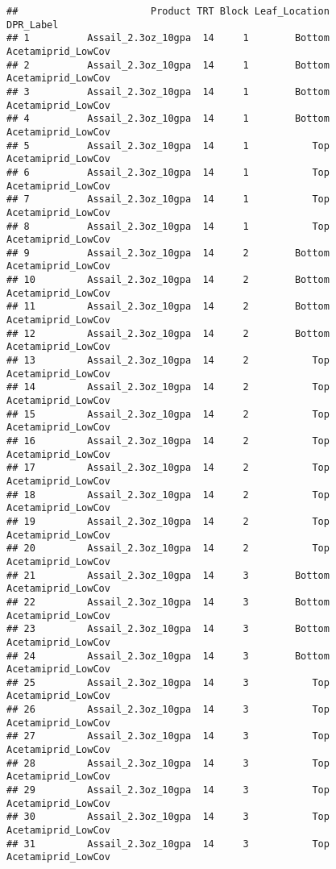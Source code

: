 \documentclass[
]{article}
\begin{document}
\begin{verbatim}
##                       Product TRT Block Leaf_Location              DPR_Label
## 1          Assail_2.3oz_10gpa  14     1        Bottom     Acetamiprid_LowCov
## 2          Assail_2.3oz_10gpa  14     1        Bottom     Acetamiprid_LowCov
## 3          Assail_2.3oz_10gpa  14     1        Bottom     Acetamiprid_LowCov
## 4          Assail_2.3oz_10gpa  14     1        Bottom     Acetamiprid_LowCov
## 5          Assail_2.3oz_10gpa  14     1           Top     Acetamiprid_LowCov
## 6          Assail_2.3oz_10gpa  14     1           Top     Acetamiprid_LowCov
## 7          Assail_2.3oz_10gpa  14     1           Top     Acetamiprid_LowCov
## 8          Assail_2.3oz_10gpa  14     1           Top     Acetamiprid_LowCov
## 9          Assail_2.3oz_10gpa  14     2        Bottom     Acetamiprid_LowCov
## 10         Assail_2.3oz_10gpa  14     2        Bottom     Acetamiprid_LowCov
## 11         Assail_2.3oz_10gpa  14     2        Bottom     Acetamiprid_LowCov
## 12         Assail_2.3oz_10gpa  14     2        Bottom     Acetamiprid_LowCov
## 13         Assail_2.3oz_10gpa  14     2           Top     Acetamiprid_LowCov
## 14         Assail_2.3oz_10gpa  14     2           Top     Acetamiprid_LowCov
## 15         Assail_2.3oz_10gpa  14     2           Top     Acetamiprid_LowCov
## 16         Assail_2.3oz_10gpa  14     2           Top     Acetamiprid_LowCov
## 17         Assail_2.3oz_10gpa  14     2           Top     Acetamiprid_LowCov
## 18         Assail_2.3oz_10gpa  14     2           Top     Acetamiprid_LowCov
## 19         Assail_2.3oz_10gpa  14     2           Top     Acetamiprid_LowCov
## 20         Assail_2.3oz_10gpa  14     2           Top     Acetamiprid_LowCov
## 21         Assail_2.3oz_10gpa  14     3        Bottom     Acetamiprid_LowCov
## 22         Assail_2.3oz_10gpa  14     3        Bottom     Acetamiprid_LowCov
## 23         Assail_2.3oz_10gpa  14     3        Bottom     Acetamiprid_LowCov
## 24         Assail_2.3oz_10gpa  14     3        Bottom     Acetamiprid_LowCov
## 25         Assail_2.3oz_10gpa  14     3           Top     Acetamiprid_LowCov
## 26         Assail_2.3oz_10gpa  14     3           Top     Acetamiprid_LowCov
## 27         Assail_2.3oz_10gpa  14     3           Top     Acetamiprid_LowCov
## 28         Assail_2.3oz_10gpa  14     3           Top     Acetamiprid_LowCov
## 29         Assail_2.3oz_10gpa  14     3           Top     Acetamiprid_LowCov
## 30         Assail_2.3oz_10gpa  14     3           Top     Acetamiprid_LowCov
## 31         Assail_2.3oz_10gpa  14     3           Top     Acetamiprid_LowCov

\end{verbatim}
\end{document}
